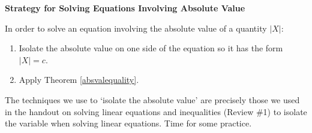 \documentclass[11pt]{article}
\theoremstyle{definition}  %
\newcommand{\bbm}{\begin{boxedminipage}{6.41in}}
\newcommand{\ebm}{\end{boxedminipage}}
\begin{document}
\medskip

\label{strategyforsolvingabseqns}

\colorbox{ResultColor}{\bbm

\centerline{\textbf{Strategy for Solving Equations Involving Absolute Value}}

\vspace{0.05in}

In order to solve an equation involving the absolute value of a quantity $|X|$:

\begin{enumerate}

\item  Isolate the absolute value on one side of the equation so it has the form $|X| = c$.

\item  Apply Theorem \ref{absvalequality}.

\end{enumerate}

\ebm}

\medskip

The techniques we use to `isolate the absolute value' are precisely those we used in the handout on solving linear equations and inequalities (Review \#1) to isolate the variable when solving linear equations.  Time for some practice.
\end{document}
